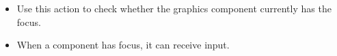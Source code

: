 \begin{itemize}
\item Use this action to check whether the graphics component currently has the focus. 
\item When a component has focus, it can receive input. 
\end{itemize}

